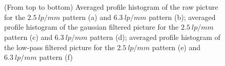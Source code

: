 \documentclass[a4paper]{article}
\begin{document}
\begin{figure}[h]
	\centering
  \\
  \\
  \caption{(From top to bottom) Averaged profile histogram of the raw picture for the $2.5\ lp/mm$ pattern (a) and $6.3\ lp/mm$ pattern (b); averaged profile histogram of the gaussian filtered picture for the $2.5\ lp/mm$ pattern (c) and $6.3\ lp/mm$ pattern (d); averaged profile histogram of the low-pass filtered picture for the $2.5\ lp/mm$ pattern (e) and $6.3\ lp/mm$ pattern (f)}
  \label{fig:ex_two_pro}
\end{figure}
\end{document}
